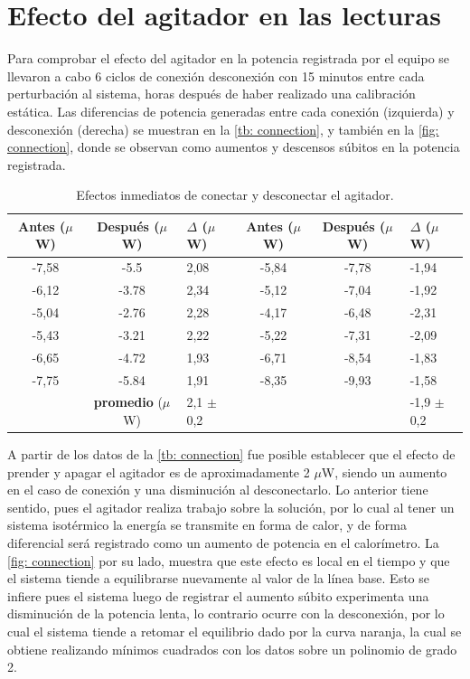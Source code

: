 	\section{Efecto del agitador en las lecturas}
	Para comprobar el efecto del agitador en la potencia registrada por el equipo se llevaron a cabo 6 ciclos de conexión desconexión con 15 minutos entre cada perturbación al sistema, horas después de haber realizado una calibración estática. Las diferencias de potencia generadas entre cada conexión (izquierda) y desconexión (derecha) se muestran en la \autoref{tb: connection}, y también en la \autoref{fig: connection}, donde se observan como aumentos y descensos súbitos en la potencia registrada.
	\begin{table}[h]
		\centering
		\caption{Efectos inmediatos de conectar y desconectar el agitador.}
		\begin{tabular}{cc|l|cc|l}
			\hline
			\textbf{Antes ($\mu$W)} & \textbf{Después ($\mu$W)} &  $\Delta$ ($\mu$W) &  \textbf{Antes ($\mu$W)} & \textbf{Después ($\mu$W)} &  $\Delta$ ($\mu$W) \\
			\hline
			-7,58 &  -5.5 & 2,08 & -5,84 & -7,78 & -1,94 \\
			-6,12 & -3.78 & 2,34 & -5,12 & -7,04 & -1,92 \\
			-5,04 & -2.76 & 2,28 & -4,17 & -6,48 & -2,31 \\
			-5,43 & -3.21 & 2,22 & -5,22 & -7,31 & -2,09 \\
			-6,65 & -4.72 & 1,93 & -6,71 & -8,54 & -1,83 \\
			-7,75 & -5.84 & 1,91 & -8,35 & -9,93 & -1,58 \\
			\hline
			 & \textbf{promedio} ($\mu$W) & 2,1 $\pm$ 0,2 & & & -1,9 $\pm$ 0,2 \\
			\hline
		\end{tabular}
		\label{tb: connection}
	\end{table}

	A partir de los datos de la \autoref{tb: connection} fue posible establecer que el efecto de prender y apagar el agitador es de aproximadamente 2 $\mu$W, siendo un aumento en el caso de conexión y una disminución al desconectarlo. Lo anterior tiene sentido, pues el agitador realiza trabajo sobre la solución, por lo cual al tener un sistema isotérmico la energía se transmite en forma de calor, y de forma diferencial será registrado como un aumento de potencia en el calorímetro. La \autoref{fig: connection} por su lado, muestra que este efecto es local en el tiempo y que el sistema tiende a equilibrarse nuevamente al valor de la línea base. Esto se infiere pues el sistema luego de registrar el aumento súbito experimenta una disminución de la potencia lenta, lo contrario ocurre con la desconexión, por lo cual el sistema tiende a retomar el equilibrio dado por la curva naranja, la cual se obtiene realizando mínimos cuadrados con los datos sobre un polinomio de grado 2.
	
